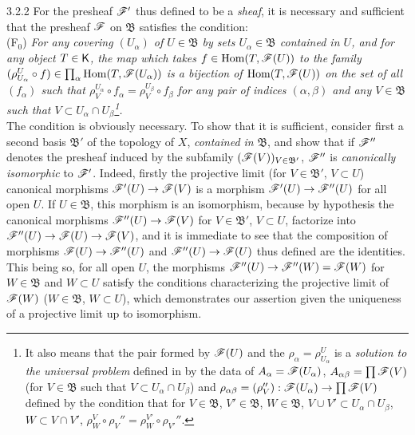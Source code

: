 \documentclass[10pt,oneside]{book}
\begin{document}
\begin{env}{3.2.2}
\label{env-0.3.2.2}
For the presheaf $\mathscr{F}'$ thus defined to be a \emph{sheaf}, it is necessary and sufficient
that the presheaf $\mathscr{F}$ on $\mathfrak{B}$ satisfies the condition:\\

(F$_0$) \emph{For any covering $(U_\alpha)$ of $U\in\mathfrak{B}$ by sets
        $U_\alpha\in\mathfrak{B}$ contained in $U$, and for any object $T\in\mathsf{K}$, the map
        which takes $f\in{\mathop{\mathrm{Hom}}\nolimits}(T,\mathscr{F}(U))$ to the family
        $(\rho_{U_\alpha}^U\circ f)\in\prod_\alpha{\mathop{\mathrm{Hom}}\nolimits}(T,\mathscr{F}(U_\alpha))$ is a bijection of
        ${\mathop{\mathrm{Hom}}\nolimits}(T,\mathscr{F}(U))$ on the set of all $(f_\alpha)$ such that
        $\rho_V^{U_\alpha}\circ f_\alpha=\rho_V^{U_\beta}\circ f_\beta$ for any pair of
        indices $(\alpha,\beta)$ and any $V\in\mathfrak{B}$ such that
        $V\subset U_\alpha\cap U_\beta$\footnote{It also means that the pair formed by
        $\mathscr{F}(U)$ and the $\rho_\alpha=\rho_{U_\alpha}^U$ is a \emph{solution to the
        universal problem} defined in  by the data of
        $A_\alpha=\mathscr{F}(U_\alpha)$, $A_{\alpha\beta}=\prod\mathscr{F}(V)$ (for $V\in\mathfrak{B}$
        such that $V\subset U_\alpha\cap U_\beta$) and
        $\rho_{\alpha\beta}=(\rho_V''):\mathscr{F}(U_\alpha)\to\prod\mathscr{F}(V)$ defined by the
        condition that for $V\in\mathfrak{B}$, $V'\in\mathfrak{B}$, $W\in\mathfrak{B}$,
        $V\cup V'\subset U_\alpha\cap U_\beta$, $W\subset V\cap V'$,
        $\rho_W^V\circ\rho_V''=\rho_W^{V'}\circ\rho_{V'}''$.}.}\\

The condition is obviously necessary. To show that it is sufficient, consider first a second
basis $\mathfrak{B}'$ of the topology of $X$, \emph{contained in} $\mathfrak{B}$, and show
that if $\mathscr{F}''$ denotes the presheaf induced by the subfamily
$(\mathscr{F}(V))_{V\in\mathfrak{B}'}$, $\mathscr{F}''$ is \emph{canonically isomorphic} to $\mathscr{F}'$.
Indeed, firstly the projective limit (for $V\in\mathfrak{B}'$, $V\subset U$) canonical
morphisms ${\mathscr{F}'(U)\to\mathscr{F}(V)}$ is a morphism $\mathscr{F}'(U)\to\mathscr{F}''(U)$ for all open
$U$. If $U\in\mathfrak{B}$, this morphism is an isomorphism, because by hypothesis the
canonical morphisms $\mathscr{F}''(U)\to\mathscr{F}(V)$ for $V\in\mathfrak{B}'$, $V\subset U$,
factorize into $\mathscr{F}''(U)\to\mathscr{F}(U)\to\mathscr{F}(V)$, and it is immediate to see that the
composition of morphisms $\mathscr{F}(U)\to\mathscr{F}''(U)$ and $\mathscr{F}''(U)\to\mathscr{F}(U)$ thus defined
are the identities. This being so, for all open $U$, the morphisms
$\mathscr{F}''(U)\to\mathscr{F}''(W)=\mathscr{F}(W)$ for $W\in\mathfrak{B}$ and $W\subset U$ satisfy the
conditions characterizing the projective limit of $\mathscr{F}(W)$ ($W\in\mathfrak{B}$,
$W\subset U$), which demonstrates our assertion given the uniqueness of a projective limit up
to isomorphism.


\end{env}
\end{document}
